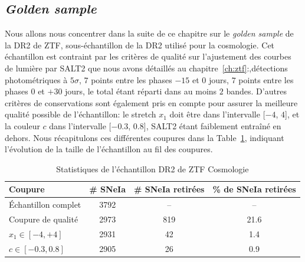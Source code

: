 \documentclass[../main/main.tex]{subfiles}
\begin{document}
\subsection{\textit{Golden sample}}

Nous allons nous concentrer dans la suite de ce chapitre sur le \textit{golden
  sample} de la DR2 de ZTF, sous-échantillon de la DR2
utilisé pour la cosmologie. Cet échantillon est contraint par les
critères de qualité sur l'ajustement des courbes de lumière par SALT2
que nous avons détaillés au chapitre~\ref{ch:ztf}:,détections
photométriques à $5\sigma$, $7$ points entre les phases $-15$ et $0$
jours, $7$ points entre les phases $0$ et $+30$ jours, le total étant
réparti dans au moins $2$ bandes.
D'autres critères de conservations sont également pris en compte pour assurer la
meilleure qualité possible de l'échantillon: le stretch $x_{1}$ doit être dans
l'intervalle [$-4$, $4$], et la couleur $c$ dans l'intervalle
[$-0.3$, $0.8$], SALT2 étant faiblement entraîné en dehors. 
Nous récapitulons ces différentes coupures dans la
Table~\ref{tab:sample}, indiquant l'évolution de la taille de
l'échantillon au fil des coupures.

\begin{table}[ht]
  \centerfloat
  \renewcommand{\arraystretch}{1.3}
  \begin{threeparttable}
    \caption{Statistiques de l'échantillon DR2 de ZTF Cosmologie}
    \label{tab:sample}
    \begin{tabular}{l c c c}
      \toprule
      Coupure  & \# SNeIa & \# SNeIa retirées & \% de SNeIa retirées \\[0.15em]
      \midrule
      \'Echantillon complet  & 3792 & -- & --\\[0.15em]
       Coupure de qualité & 2973 & 819 & 21.6 \\[0.30em]
       $x_1 \in [-4,+4]$  & 2931 & 42 & 1.4 \\[0.30em]
       $c \in [-0.3,0.8]$  & 2905 & 26 & 0.9 \\[0.30em]
      \bottomrule
    \end{tabular}
  \end{threeparttable}
\end{table}
\end{document}
